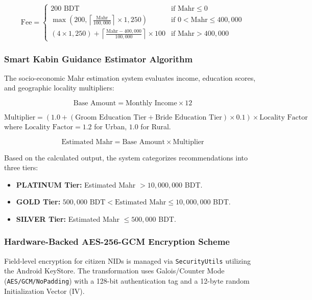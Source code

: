 \documentclass[12pt,a4paper]{article}
\begin{document}
	\begin{equation}
		\text{Fee} =
		\begin{cases}
			200 \text{ BDT} & \text{if } \text{Mahr} \le 0 \\
			\max\left(200, \left\lceil \frac{\text{Mahr}}{100{,}000} \right\rceil \times 1{,}250\right) & \text{if } 0 < \text{Mahr} \le 400{,}000 \\
			(4 \times 1{,}250) + \left\lceil \frac{\text{Mahr} - 400{,}000}{100{,}000} \right\rceil \times 100 & \text{if } \text{Mahr} > 400{,}000
		\end{cases}
	\end{equation}
	
	\subsubsection{Smart Kabin Guidance Estimator Algorithm}
	The socio-economic Mahr estimation system evaluates income, education scores, and geographic locality multipliers:
	
	\begin{equation}
		\text{Base Amount} = \text{Monthly Income} \times 12
	\end{equation}
	
	\begin{equation}
		\text{Multiplier} = \left(1.0 + (\text{Groom Education Tier} + \text{Bride Education Tier}) \times 0.1\right) \times \text{Locality Factor}
	\end{equation}
	\noindent where $\text{Locality Factor} = 1.2$ for Urban, $1.0$ for Rural.
	
	\begin{equation}
		\text{Estimated Mahr} = \text{Base Amount} \times \text{Multiplier}
	\end{equation}
	
	Based on the calculated output, the system categorizes recommendations into three tiers:
	\begin{itemize}
		\item \textbf{PLATINUM Tier:} Estimated Mahr $> 10{,}000{,}000$ BDT.
		\item \textbf{GOLD Tier:} $500{,}000 \text{ BDT} < \text{Estimated Mahr} \le 10{,}000{,}000$ BDT.
		\item \textbf{SILVER Tier:} Estimated Mahr $\le 500{,}000$ BDT.
	\end{itemize}
	
	\subsubsection{Hardware-Backed AES-256-GCM Encryption Scheme}
	Field-level encryption for citizen NIDs is managed via \texttt{SecurityUtils} utilizing the Android KeyStore. The transformation uses Galois/Counter Mode (\texttt{AES/GCM/NoPadding}) with a 128-bit authentication tag and a 12-byte random Initialization Vector (IV).
	
\end{document}
